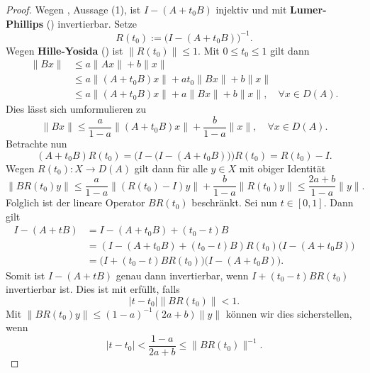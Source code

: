 \begin{proof}
Wegen , Aussage (1), ist $I-(A+t_0B)$ injektiv und mit \textbf{Lumer-Phillips} () invertierbar. Setze
\begin{equation*}
R(t_0):=\big(I-(A+t_0B)\big)^{-1}.
\end{equation*}
Wegen \textbf{Hille-Yosida} () ist $\|R(t_0)\|\leq 1$. Mit $0\leq t_0\leq 1$ gilt dann
\begin{align*}
\|Bx\|
&\leq a\|Ax\|+ b\|x\|\\
&\leq a\|(A+t_0 B)x\| + at_0\|Bx\|+b\|x\|\\
&\leq a\|(A+t_0B)x\| + a\|Bx\| + b\|x\|,\quad \forall x\in D(A). 
\end{align*}
Dies lässt sich umformulieren zu
\begin{equation*}
    \|Bx\|\leq \frac{a}{1-a}\|(A+t_0B)x\| + \frac{b}{1-a}\|x\|,\quad\forall x\in D(A).
\end{equation*}
Betrachte nun
\begin{equation*}
    (A+t_0B)R(t_0)=\big(I-\big(I-(A+t_0B)\big)\big)R(t_0)=R(t_0) - I.
\end{equation*}
Wegen $R(t_0)\colon X\to D(A)$ gilt dann für alle $y\in X$ mit obiger Identität 
\begin{equation*}
    \|BR(t_0)y\|\leq \frac{a}{1-a}\|(R(t_0)-I)y\|+\frac{b}{1-a}\|R(t_0)y\|\leq\frac{2a+b}{1-a}\|y\|.
\end{equation*}
Folglich ist der lineare Operator $BR(t_0)$ beschränkt. Sei nun $t\in[0,1]$. Dann gilt
\begin{align*}
    I-(A+tB)
    &=I-(A+t_0 B)+ (t_0-t)B\\
    &=(I-(A+t_0B)+(t_0-t)B)R(t_0)\big(I-(A+t_0B)\big)\\
    &= \big(I+(t_0-t)BR(t_0)\big)\big(I-(A+t_0B)\big).
\end{align*}
Somit ist $I-(A+tB)$ genau dann invertierbar, wenn $I+(t_0-t)BR(t_0)$ invertierbar ist. Dies ist mit  erfüllt, falls 
\begin{equation*}
    |t-t_0|\|BR(t_0)\|<1.
\end{equation*}
Mit $\|BR(t_0)y\|\leq (1-a)^{-1}(2a+b)\|y\|$ können wir dies sicherstellen, wenn
\begin{equation*}
    |t-t_0|<\frac{1-a}{2a+b}\leq\|BR(t_0)\|^{-1}.
\end{equation*}


\end{proof}
